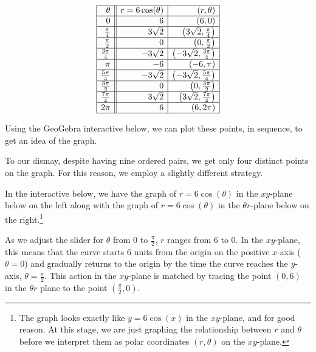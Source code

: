 \documentclass{ximera}
\begin{document}
\[ \begin{array}{|r||r|r|} \hline
\theta & r = 6\cos(\theta) & (r,\theta) \\ \hline
0  & 6 & (6,0) \\  \hline
\frac{\pi}{4}  & 3\sqrt{2} & \left(3\sqrt{2}, \frac{\pi}{4}\right) \\ \hline 
\frac{\pi}{2}  & 0 & \left(0,\frac{\pi}{2}\right) \\ \hline 
\frac{3\pi}{4}  & -3\sqrt{2} & \left(-3\sqrt{2}, \frac{3\pi}{4}\right) \\  \hline 
\pi & -6 & (-6,\pi) \\  \hline 
\frac{5\pi}{4}  & -3\sqrt{2} & \left(-3\sqrt{2}, \frac{5\pi}{4}\right) \\ \hline 
\frac{3\pi}{2}  & 0 & \left(0, \frac{3\pi}{2} \right) \\ \hline 
\frac{7\pi}{4}  & 3\sqrt{2} & \left(3\sqrt{2}, \frac{7\pi}{4}\right) \\  \hline 
2\pi  & 6 & (6,2\pi) \\  \hline
\end{array} \]

Using the GeoGebra interactive below, we can plot these points, in sequence, to get an idea of the graph.

\begin{center}
\end{center}


To our dismay, despite having nine ordered pairs, we get only four distinct points on the graph.  For this reason, we employ a slightly different strategy.  

In the interactive below, we have the graph of $r = 6\cos(\theta)$  in the $xy$-plane below on the left along with the graph of $r = 6\cos(\theta)$ in the $\theta r$-plane below on the right.\footnote{The graph looks exactly like $y = 6\cos(x)$ in the $xy$-plane, and for good reason. At this stage, we are just graphing the relationship between $r$ and $\theta$ before we interpret them as polar coordinates $(r,\theta)$ on the $xy$-plane.}   

As we adjust the slider for $\theta$ from $0$ to $\frac{\pi}{2}$, $r$ ranges from $6$ to $0$. In the $xy$-plane, this means that the curve starts $6$ units from the origin on the positive $x$-axis ($\theta = 0$) and gradually returns to the origin by the time the curve reaches the $y$-axis, $\theta = \frac{\pi}{2}$. This action in the $xy$-plane is matched by tracing the point $(0,6)$ in the $\theta r$ plane to the point $\left( \frac{\pi}{2}, 0\right)$.
\end{document}

